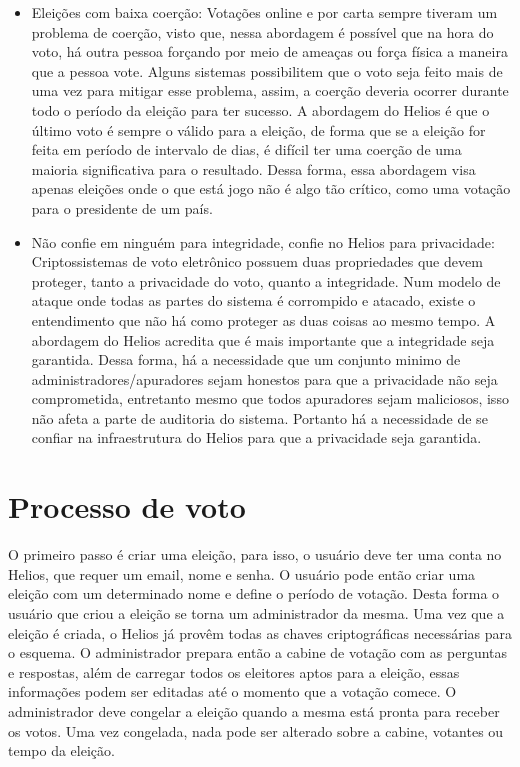 \documentclass{ufsctex/ufsctex}
\begin{document}
\begin{itemize}

	\item Eleições com baixa coerção: Votações online e por carta sempre
		tiveram um problema de coerção, visto que, nessa abordagem é possível
		que na hora do voto, há outra pessoa forçando por meio de ameaças ou
		força física a maneira que a pessoa vote. Alguns sistemas possibilitem
		que o voto seja feito mais de uma vez para mitigar esse problema,
		assim, a coerção deveria ocorrer durante todo o período da eleição para
		ter sucesso. A abordagem do Helios é que o último voto é sempre o
		válido para a eleição, de forma que se a eleição for feita em período
		de intervalo de dias, é difícil ter uma coerção de uma maioria
		significativa para o resultado. Dessa forma, essa abordagem visa apenas
		eleições onde o que está jogo não é algo tão crítico, como uma votação
		para o presidente de um país.
	\item Não confie em ninguém para integridade, confie no Helios para
		privacidade: Criptossistemas de voto eletrônico possuem duas
		propriedades que devem proteger, tanto a privacidade do voto, quanto a
		integridade. Num modelo de ataque onde todas as partes do sistema é
		corrompido e atacado, existe o entendimento que não há como proteger as
		duas coisas ao mesmo tempo. A abordagem do Helios acredita que é mais
		importante que a integridade seja garantida. Dessa forma, há a
		necessidade que um conjunto minimo de administradores/apuradores sejam
		honestos para que a privacidade não seja comprometida, entretanto mesmo
		que todos apuradores sejam maliciosos, isso não afeta a parte de
		auditoria do sistema. Portanto há a necessidade de se confiar na infraestrutura do Helios
		para que a privacidade seja garantida.

\end{itemize}

\section{Processo de voto}

O primeiro passo é criar uma eleição, para isso, o usuário deve ter uma conta
no Helios, que requer um email, nome e senha. O usuário pode então criar uma
eleição com um determinado nome e define o período de votação. Desta forma o
usuário que criou a eleição se torna um administrador da mesma. Uma vez que a
eleição é criada, o Helios já provêm todas as chaves criptográficas necessárias
para o esquema. O administrador prepara então a cabine de votação com as
perguntas e respostas, além de carregar todos os eleitores aptos para a
eleição, essas informações podem ser editadas até o momento que a votação
comece. O administrador deve congelar a eleição quando a mesma está pronta para
receber os votos. Uma vez congelada, nada pode ser alterado sobre a cabine,
votantes ou tempo da eleição.
\end{document}
